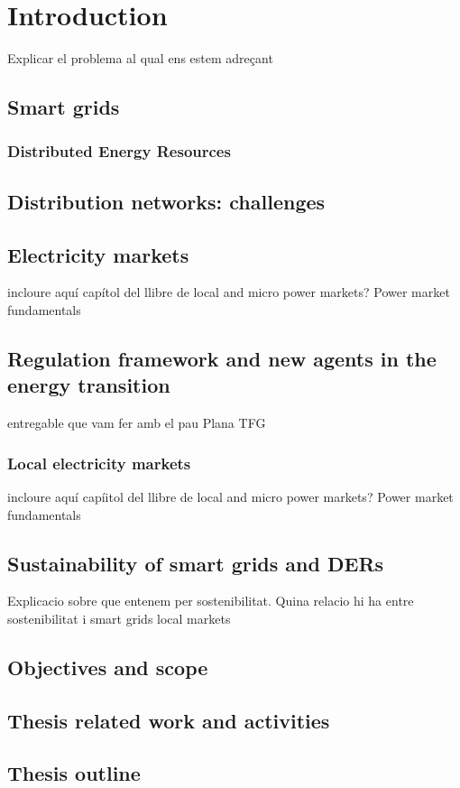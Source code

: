 \chapter{Introduction}
\label{chapterIntro}

Explicar el problema al qual ens estem adreçant 

\section{Smart grids}

\subsection{Distributed Energy Resources} \label{subsec:DG}

\section{Distribution networks: challenges}

\section{Electricity markets}
incloure aquí capítol del llibre de local and micro power markets? 
Power market fundamentals 


\section{Regulation framework and new agents in the energy transition}
entregable que vam fer amb el pau Plana TFG

\subsection{Local electricity markets}
incloure aquí capíitol del llibre de local and micro power markets? 
Power market fundamentals 

\section{Sustainability of smart grids and DERs}
Explicacio sobre que entenem per sostenibilitat. Quina relacio hi ha entre sostenibilitat i smart grids local markets 

\newpage 
\section{Objectives and scope}
	
\newpage 
\section{Thesis related work and activities}
	

\newpage 
\section{Thesis outline}
	


